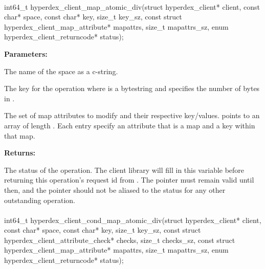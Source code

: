 \paragraph{}
\label{api:c:map_atomic_div}
\begin{ccode}
int64_t hyperdex_client_map_atomic_div(struct hyperdex_client* client,
                const char* space,
                const char* key, size_t key_sz,
                const struct hyperdex_client_map_attribute* mapattrs, size_t mapattrs_sz,
                enum hyperdex_client_returncode* status);
\end{ccode}
\funcdesc 

\noindent\textbf{Parameters:}
\begin{description}[labelindent=\widthof{{\code{mapattrs}, \code{mapattrs\_sz}}},leftmargin=*,noitemsep,nolistsep,align=right]
\item[\code{space}] The name of the space as a c-string.
\item[\code{key}, \code{key\_sz}] The key for the operation where  is a bytestring and  specifies the number of bytes in .
\item[\code{mapattrs}, \code{mapattrs\_sz}] The set of map attributes to modify and their respective key/values.   points to an array of length .  Each entry specify an attribute that is a map and a key within that map.
\end{description}

\noindent\textbf{Returns:}
\begin{description}[labelindent=\widthof{{\code{status}}},leftmargin=*,noitemsep,nolistsep,align=right]
\item[\code{status}] The status of the operation.  The client library will fill in this variable before returning this operation's request id from .  The pointer must remain valid until then, and the pointer should not be aliased to the status for any other outstanding operation.
\end{description}

\paragraph{}
\label{api:c:cond_map_atomic_div}
\begin{ccode}
int64_t hyperdex_client_cond_map_atomic_div(struct hyperdex_client* client,
                const char* space,
                const char* key, size_t key_sz,
                const struct hyperdex_client_attribute_check* checks, size_t checks_sz,
                const struct hyperdex_client_map_attribute* mapattrs, size_t mapattrs_sz,
                enum hyperdex_client_returncode* status);
\end{ccode}
\funcdesc 

